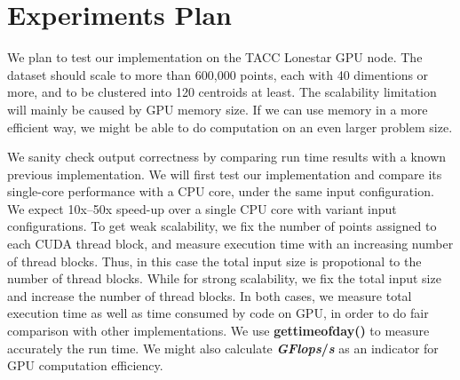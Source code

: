 \documentclass{article}
\begin{document}
\section{Experiments Plan}
We plan to test our implementation on the TACC Lonestar GPU node. 
The dataset should scale to more than 600,000 points, each with 
40 dimentions or more, and to be clustered into 120 centroids at least. 
The scalability limitation will mainly be caused by GPU memory size. If
we can use memory in a more efficient way, we might be able to do
computation on an even larger problem size. 

We sanity check output correctness by comparing run time results with a known 
previous implementation. 
We will first test our implementation and compare its single-core performance with 
a CPU core, under the same input configuration. We expect 10x--50x speed-up 
over a single CPU core with variant input configurations.
To get weak scalability, we fix the number of points assigned to
each CUDA thread block, and measure execution time with an increasing number 
of thread blocks. Thus, in this case the total input size is propotional to
the number of thread blocks.
While for strong scalability, we fix the total input size and increase the 
number of thread blocks. 
In both cases, we measure total execution time as well as time consumed by code
on GPU, in order to do fair comparison with other implementations.
We use \textbf{gettimeofday()} to measure accurately the run time.
We might also calculate \textbf{\textit{GFlops}/\textit{s}} as an indicator for GPU
computation efficiency.



\end{document}
